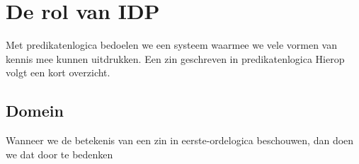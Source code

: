 \section{De rol van IDP}
Met predikatenlogica bedoelen we een systeem waarmee we vele vormen van kennis mee kunnen uitdrukken. Een zin geschreven in predikatenlogica  Hierop volgt een kort overzicht.

\subsection{Domein}
Wanneer we de betekenis van een zin in eerste-ordelogica beschouwen, dan doen we dat door te bedenken 